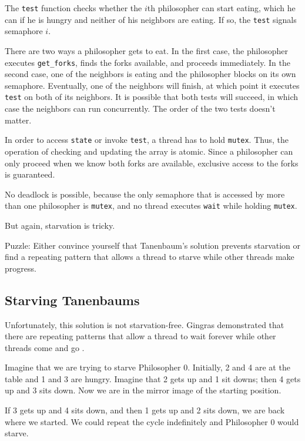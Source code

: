 \documentclass{book}
\newcommand{\clearemptydoublepage}{\newpage\cleardoublepage}
\begin{document}
The {\tt test} function checks whether the $i$th philosopher can
start eating, which he can if he is hungry and
neither of his neighbors are eating.  If so, the {\tt test} signals
semaphore $i$.

There are two ways a philosopher gets to eat.  In the first case, the
philosopher executes {\tt get\_forks}, finds the forks available, and
proceeds immediately.  In the second case, one of the neighbors is
eating and the philosopher blocks on its own semaphore.  Eventually,
one of the neighbors will finish, at which point it executes {\tt
test} on both of its neighbors.  It is possible that both tests
will succeed, in which case the neighbors can run concurrently.
The order of the two tests doesn't matter.

In order to access {\tt state} or invoke {\tt test}, a thread
has to hold {\tt mutex}.  Thus, the operation of checking and
updating the array is atomic.  Since a philosopher can only proceed
when we know both forks are available, exclusive access to the forks
is guaranteed.

No deadlock is possible, because the only semaphore that is accessed
by more than one philosopher is {\tt mutex}, and no thread executes
{\tt wait} while holding {\tt mutex}.

But again, starvation is tricky.

Puzzle: Either convince yourself that Tanenbaum's solution prevents
starvation or find a repeating pattern that allows a thread to starve
while other threads make progress.


\clearemptydoublepage
\subsection{Starving Tanenbaums}

Unfortunately, this solution is not starvation-free.  Gingras
demonstrated that there are repeating patterns that allow a
thread to wait forever while other threads come and go
\cite{gingras90dining}.

Imagine that we are trying to starve Philosopher 0.  Initially,
2 and 4 are at the table and 1 and 3 are hungry.  Imagine that 2 gets up and
1 sit downs; then 4 gets up and 3 sits down.
Now we are in the mirror image of the starting position.

If 3 gets up and 4 sits
down, and then 1 gets up and 2 sits down, we are back
where we started.  We could repeat the cycle indefinitely and
Philosopher 0 would starve.
\end{document}
